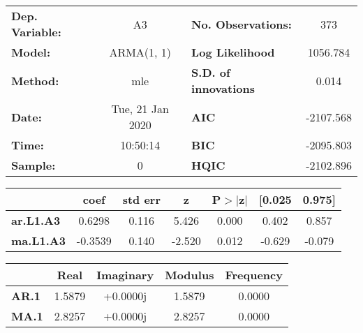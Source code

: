 \begin{center}
\begin{tabular}{lclc}
\toprule
\textbf{Dep. Variable:} &             A3            & \textbf{  No. Observations:  } &            373             \\
\textbf{Model:}         &         ARMA(1, 1)        & \textbf{  Log Likelihood     } &          1056.784          \\
\textbf{Method:}        &            mle            & \textbf{  S.D. of innovations} &           0.014            \\
\textbf{Date:}          &      Tue, 21 Jan 2020     & \textbf{  AIC                } &         -2107.568          \\
\textbf{Time:}          &          10:50:14         & \textbf{  BIC                } &         -2095.803          \\
\textbf{Sample:}        &             0             & \textbf{  HQIC               } &         -2102.896          \\
\bottomrule
\end{tabular}
\begin{tabular}{lcccccc}
                  & \textbf{coef} & \textbf{std err} & \textbf{z} & \textbf{P$>$$|$z$|$} & \textbf{[0.025} & \textbf{0.975]}  \\
\midrule
\textbf{ar.L1.A3} &       0.6298  &        0.116     &     5.426  &         0.000        &        0.402    &        0.857     \\
\textbf{ma.L1.A3} &      -0.3539  &        0.140     &    -2.520  &         0.012        &       -0.629    &       -0.079     \\
\bottomrule
\end{tabular}
\begin{tabular}{lcccc}
              & \textbf{            Real} & \textbf{         Imaginary} & \textbf{         Modulus} & \textbf{        Frequency}  \\
\midrule
\textbf{AR.1} &                1.5879     &                +0.0000j     &                1.5879     &                0.0000       \\
\textbf{MA.1} &                2.8257     &                +0.0000j     &                2.8257     &                0.0000       \\
\bottomrule
\end{tabular}
\end{center}